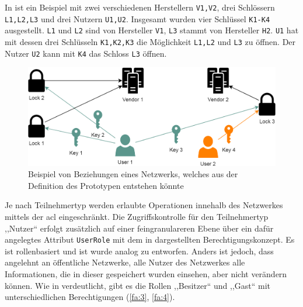         \noindent In  ist ein Beispiel mit zwei verschiedenen Herstellern \colorbox{light-gray}{\lstinline{V1,V2}}, drei Schlössern \colorbox{light-gray}{\lstinline{L1,L2,L3}} und drei Nutzern \colorbox{light-gray}{\lstinline{U1,U2}}. 
        Insgesamt wurden vier Schlüssel \colorbox{light-gray}{\lstinline{K1-K4}} ausgestellt.
        \colorbox{light-gray}{\lstinline{L1}} und \colorbox{light-gray}{\lstinline{L2}} sind von Hersteller \colorbox{light-gray}{\lstinline{V1}}, \colorbox{light-gray}{\lstinline{L3}} stammt von Hersteller \colorbox{light-gray}{\lstinline{H2}}. 
        \colorbox{light-gray}{\lstinline{U1}} hat mit dessen drei Schlüsseln \colorbox{light-gray}{\lstinline{K1,K2,K3}} die Möglichkeit \colorbox{light-gray}{\lstinline{L1,L2}} und \colorbox{light-gray}{\lstinline{L3}} zu öffnen. 
        Der Nutzer \colorbox{light-gray}{\lstinline{U2}} kann mit \colorbox{light-gray}{\lstinline{K4}} das Schloss \colorbox{light-gray}{\lstinline{L3}} öffnen.
        \begin{figure}[H]
    		\centering
    		\includegraphics[width=\textwidth]{graphics/pt_network.png}
    		\caption[Beispiel eines von Beziehungen im Prototypen-Netzwerk]{Beispiel von Beziehungen eines Netzwerks, welches aus der Definition des Prototypen entstehen könnte}
    		\label{fig:pt_network}
    	\end{figure}
        \noindent Je nach Teilnehmertyp werden erlaubte Operationen innehalb des Netzwerkes mittels der \gls{acl} eingeschränkt. 
        Die Zugriffskontrolle für den Teilnehmertyp ,,Nutzer`` erfolgt zusätzlich auf einer feingranulareren Ebene über ein dafür angelegtes Attribut \colorbox{light-gray}{\lstinline{UserRole}} mit dem in  dargestellten Berechtigungskonzept. 
        Es ist rollenbasiert und ist wurde analog zu  entworfen. 
        Anders ist jedoch, dass angelehnt an öffentliche Netzwerke, alle Nutzer des Netzwerkes alle Informationen, die in dieser gespeichert wurden einsehen, aber nicht verändern können. 
        Wie in  verdeutlicht, gibt es die Rollen ,,Besitzer`` und ,,Gast`` mit unterschiedlichen Berechtigungen (\ref{fa:3}, \ref{fa:4}). 
